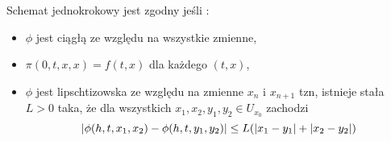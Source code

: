 \documentclass[12pt,a4paper]{report}
\begin{document}
\begin{definition}\label{definition-consistency}
Schemat jednokrokowy jest zgodny jeśli :
\begin{itemize}
\item $\phi$ jest ciągłą ze względu na wszystkie zmienne,
\item $\pi(0,t,x,x) = f(t,x)$ dla każdego $(t,x)$,
\item $\phi$ jest lipschtizowska ze względu na zmienne $x_n$ i $x_{n+1}$ tzn, istnieje stała $L>0$ taka, że dla wszystkich $x_1,x_2,y_1,y_2 \in U_{x_0}$ zachodzi
$$
{\left| {\phi(h,t,x_1,x_2) - \phi(h,t,y_1,y_2)} \right|} \leq L  ( {\left| {x_1 - y_1} \right|} + {\left| {x_2 - y_2} \right|})
$$
\end{itemize}

\end{definition}
\end{document}
